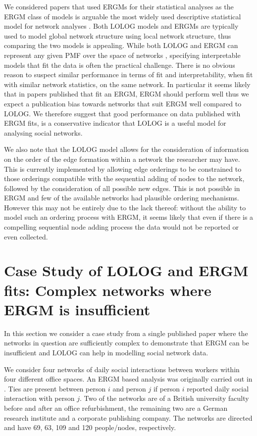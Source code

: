 \documentclass[
]{statsoc}
\begin{document}
We considered papers that used ERGMs for their statistical analyses as
the ERGM class of models is arguable the most widely used descriptive
statistical model for network analyses \citep{Amati2018}. Both LOLOG
models and ERGMs are typically used to model global network structure
using local network structure, thus comparing the two models is
appealing. While both LOLOG and ERGM can represent any given PMF over
the space of networks \citep{Fellows2018}, specifying interpretable
models that fit the data is often the practical challenge. There is no
obvious reason to suspect similar performance in terms of fit and
interpretability, when fit with similar network statistics, on the same
network. In particular it seems likely that in papers published that fit
an ERGM, ERGM should perform well thus we expect a publication bias
towards networks that suit ERGM well compared to LOLOG. We therefore
suggest that good performance on data published with ERGM fits, is a
conservative indicator that LOLOG is a useful model for analysing social
networks.

We also note that the LOLOG model allows for the consideration of
information on the order of the edge formation within a network the
researcher may have. This is currently implemented by allowing edge
orderings to be constrained to those orderings compatible with the
sequential adding of nodes to the network, followed by the consideration
of all possible new edges. This is not possible in ERGM and few of the
available networks had plausible ordering mechanisms. However this may
not be entirely due to the lack thereof: without the ability to model
such an ordering process with ERGM, it seems likely that even if there
is a compelling sequential node adding process the data would not be
reported or even collected.

\section{Case Study of LOLOG and ERGM fits: Complex networks where ERGM is insufficient}\label{sec:offices}

In this section we consider a case study from a single published paper
where the networks in question are sufficiently complex to demonstrate
that ERGM can be insufficient and LOLOG can help in modelling social
network data.

We consider four networks of daily social interactions between workers
within four different office spaces. An ERGM based analysis was
originally carried out in \cite{Sailer2012}. Ties are present between
person \(i\) and person \(j\) if person \(i\) reported daily social
interaction with person \(j\). Two of the networks are of a British
university faculty before and after an office refurbishment, the
remaining two are a German research institute and a corporate publishing
company. The networks are directed and have 69, 63, 109 and 120
people/nodes, respectively.
\end{document}
